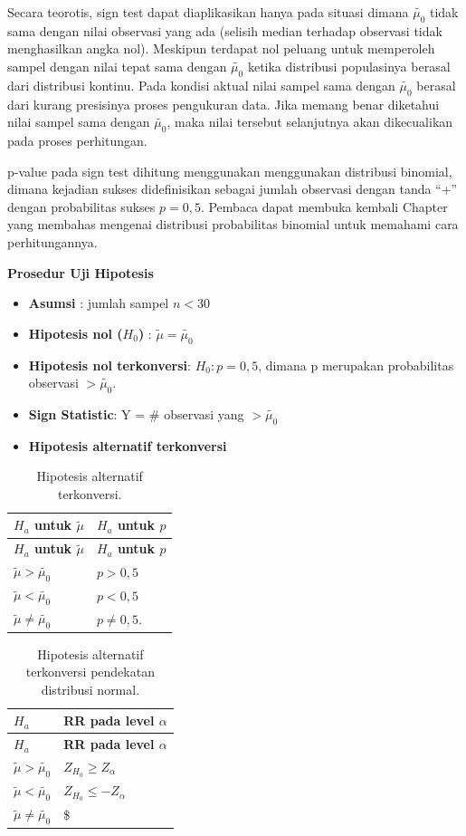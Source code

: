 \documentclass[]{book}
\providecommand{\tightlist}{%
  \setlength{\itemsep}{0pt}\setlength{\parskip}{0pt}}
\begin{document}
Secara teorotis, sign test dapat diaplikasikan hanya pada situasi dimana
\(\tilde{\mu_0}\) tidak sama dengan nilai observasi yang ada (selisih
median terhadap observasi tidak menghasilkan angka nol). Meskipun
terdapat nol peluang untuk memperoleh sampel dengan nilai tepat sama
dengan \(\tilde{\mu_0}\) ketika distribusi populasinya berasal dari
distribusi kontinu. Pada kondisi aktual nilai sampel sama dengan
\(\tilde{\mu_0}\) berasal dari kurang presisinya proses pengukuran data.
Jika memang benar diketahui nilai sampel sama dengan \(\tilde{\mu_0}\),
maka nilai tersebut selanjutnya akan dikecualikan pada proses
perhitungan.

p-value pada sign test dihitung menggunakan menggunakan distribusi
binomial, dimana kejadian sukses didefinisikan sebagai jumlah observasi
dengan tanda ``+'' dengan probabilitas sukses \(p=0,5\). Pembaca dapat
membuka kembali Chapter yang membahas mengenai distribusi probabilitas
binomial untuk memahami cara perhitungannya.

\textbf{Prosedur Uji Hipotesis}

\begin{itemize}
\tightlist
\item
  \textbf{Asumsi} : jumlah sampel \(n<30\)
\item
  \textbf{Hipotesis nol (\(H_0\))} : \(\tilde{\mu}=\tilde{\mu_0}\)
\item
  \textbf{Hipotesis nol terkonversi}: \(H_0:p=0,5\), dimana p merupakan
  probabilitas observasi \(>\tilde{\mu_0}\).
\item
  \textbf{Sign Statistic}: Y = \# observasi yang \(>\tilde{\mu_0}\)
\item
  \textbf{Hipotesis alternatif terkonversi}
\end{itemize}

\begin{longtable}[]{@{}ll@{}}
\caption{\label{tab:signtest} Hipotesis alternatif
terkonversi.}\tabularnewline
\toprule
\textbf{\(H_a\) untuk \(\tilde{\mu}\)} & \textbf{\(H_a\) untuk
\(p\)}\tabularnewline
\midrule
\endfirsthead
\toprule
\textbf{\(H_a\) untuk \(\tilde{\mu}\)} & \textbf{\(H_a\) untuk
\(p\)}\tabularnewline
\midrule
\endhead
\(\tilde{\mu}>\tilde{\mu_0}\) & \(p>0,5\)\tabularnewline
\(\tilde{\mu}<\tilde{\mu_0}\) & \(p<0,5\)\tabularnewline
\(\tilde{\mu}\ne\tilde{\mu_0}\) & \(p\ne0,5\).\tabularnewline
\bottomrule
\end{longtable}

\begin{longtable}[]{@{}ll@{}}
\caption{\label{tab:signtest} Hipotesis alternatif terkonversi pendekatan
distribusi normal.}\tabularnewline
\toprule
\textbf{\(H_a\)} & \textbf{RR pada level \(\alpha\)}\tabularnewline
\midrule
\endfirsthead
\toprule
\textbf{\(H_a\)} & \textbf{RR pada level \(\alpha\)}\tabularnewline
\midrule
\endhead
\(\tilde{\mu}> \tilde{\mu_0}\) & \(Z_{H_0}\ge Z_\alpha\)\tabularnewline
\(\tilde{\mu}< \tilde{\mu_0}\) & \(Z_{H_0}\le -Z_\alpha\)\tabularnewline
\(\tilde{\mu}\ne\tilde{\mu_0}\) & \$\tabularnewline
\bottomrule
\end{longtable}
\end{document}
